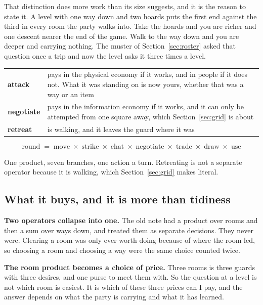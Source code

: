 \documentclass[11pt,a4paper]{article}
\begin{document}
That distinction does more work than its size suggests, and it is the reason to state it. A level
with one way down and two hoards puts the first end against the third in every room the party
walks into. Take the hoards and you are richer and one descent nearer the end of the game. Walk to
the way down and you are deeper and carrying nothing. The muster of Section~\ref{sec:roster} asked
that question once a trip and now the level asks it three times a level.

\begin{center}
\begin{tabular}{@{}l@{\hspace{5mm}}>{\raggedright\arraybackslash}p{}@{}}
\toprule
\textbf{attack}   & pays in the physical economy if it works, and in people if it does not. What
it was standing on is now yours, whether that was a way or an item \\
\textbf{negotiate}& pays in the information economy if it works, and it can only be attempted from
one square away, which Section~\ref{sec:grid} is about \\
\textbf{retreat}  & is walking, and it leaves the guard where it was \\
\bottomrule
\end{tabular}
\end{center}

\[ \text{round} \;=\; \text{move} \;\times\; \text{strike} \;\times\; \text{chat} \;\times\; \text{negotiate} \;\times\; \text{trade} \;\times\; \text{draw} \;\times\; \text{use} \]

One product, seven branches, one action a turn. Retreating is not a separate operator because it is
walking, which Section~\ref{sec:grid} makes literal.

\subsection{What it buys, and it is more than tidiness}

\textbf{Two operators collapse into one.} The old note had a product over rooms and then a sum over
ways down, and treated them as separate decisions. They never were. Clearing a room was only ever
worth doing because of where the room led, so choosing a room and choosing a way were the same
choice counted twice.

\textbf{The room product becomes a choice of price.} Three rooms is three guards with three
desires, and one purse to meet them with. So the question at a level is not which room is easiest.
It is which of these three prices can I pay, and the answer depends on what the party is carrying
and what it has learned.
\end{document}
